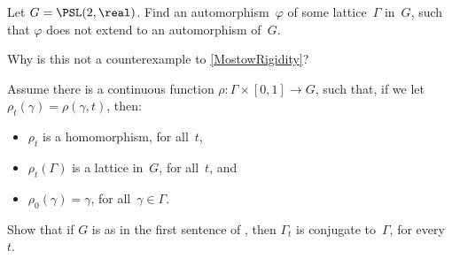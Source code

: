 \begin{exercises}
\item Let $G = \PSL(2,\real)$. 
Find an automorphism~$\varphi$ of some lattice~$\Gamma$ in~$G$, such that $\varphi$ does not extend to an automorphism of~$G$.
\par
Why is this not a counterexample to \cref{MostowRigidity}?




\item \label{deformationrigidityEx}
Assume there is a continuous function $\rho \colon \Gamma \times [0,1] \to G$, such that, if we let $\rho_t(\gamma) = \rho(\gamma,t)$, then:
 	\begin{itemize}
	\item $\rho_t$ is a homomorphism, for all~$t$,
	\item $\rho_t(\Gamma)$ is a lattice in~$G$, for all~$t$,
	and
	\item $\rho_0(\gamma) = \gamma$, for all~$\gamma \in \Gamma$.
	\end{itemize}
Show that if $G$ is as in the first sentence of , then $\Gamma_t$ is conjugate to~$\Gamma$, for every~$t$.


\end{exercises}
